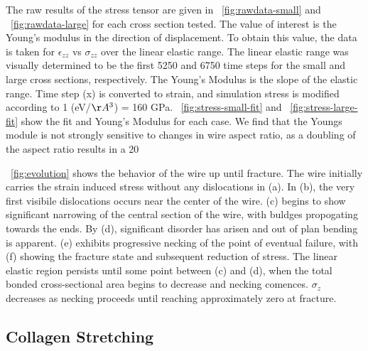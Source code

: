 \documentclass[11pt,twocolumn]{report}
\begin{document}
        The raw results of the stress tensor are given in ~\ref{fig:rawdata-small} and ~\ref{fig:rawdata-large} for each cross section tested.  The value of interest is the Young's modulus in the direction of displacement.  To obtain this value, the data is taken for $\epsilon_{zz}$ vs $\sigma_{zz}$ over the linear elastic range.  The linear elastic range was visually determined to be the first 5250 and 6750 time steps for the small and large cross sections, respectively.  The Young's Modulus is the slope of the elastic range. Time step (x) is converted to strain, and simulation stress is modified according to 1 (eV/$\AA^3$) = 160 GPa. ~\ref{fig:stress-small-fit} and ~\ref{fig:stress-large-fit} show the fit and Young's Modulus for each case.  We find that the Youngs module is not strongly sensitive to changes in wire aspect ratio, as a doubling of the aspect ratio results in a 20%

        ~\ref{fig:evolution} shows the behavior of the wire up until fracture. The wire initially carries the strain induced stress without any dislocations in (a).  In (b), the very first visibile dislocations occurs near the center of the wire. (c) begins to show significant narrowing of the central section of the wire, with buldges propogating towards the ends.   By (d), significant disorder has arisen and out of plan bending is apparent.  (e) exhibits progressive necking of the point of eventual failure, with (f) showing the fracture state and subsequent reduction of stress.  The linear elastic region persists until some point between (c) and (d), when the total bonded cross-sectional area begins to decrease and necking comences.  $\sigma_{z}$ decreases as necking proceeds until reaching approximately zero at fracture.


        \subsection{Collagen Stretching}
\end{document}
